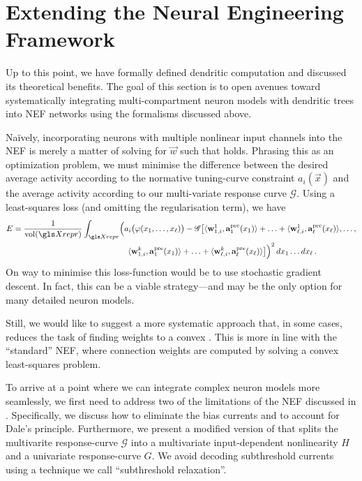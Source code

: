 
\section{Extending the Neural Engineering Framework}
\label{sec:nef_extension}

Up to this point, we have formally defined dendritic computation and discussed its theoretical benefits.
The goal of this section is to open avenues toward systematically integrating multi-compartment neuron models with dendritic trees into NEF networks using the formalisms discussed above.

Na\"ively, incorporating neurons with multiple nonlinear input channels into the NEF is merely a matter of solving for $\vec w$ such that  holds.
Phrasing this as an optimization problem, we must minimise the difference between the desired average activity according to the normative tuning-curve constraint $a_i(\vec x)$ and the average activity according to our multi-variate response curve $\mathscr{G}$.
Using a least-squares loss (and omitting the regularisation term), we have
\begin{align}
	\begin{aligned}
	E &=
	\frac{1}{\vol(\Xrepr)} \int_{\Xrepr} \Bigl( a_i\bigl(\phi(x_1, \ldots, x_\ell)\bigr) -
	\mathscr{G} \bigl[
		\langle \vec w_{1, i}^1, \vec a^\mathrm{pre}_1(x_1) \rangle + \ldots +
		\langle \vec w_{\ell, i}^1, \vec a^\mathrm{pre}_\ell(x_\ell) \rangle, \ldots,\\
	&~\hspace{13.825em}
		\langle \vec w_{1, i}^k, \vec a^\mathrm{pre}_1(x_1) \rangle + \ldots +
		\langle \vec w_{\ell, i}^k, \vec a^\mathrm{pre}_\ell(x_\ell) \rangle
	\bigr] \Bigr)^2 \,dx_1 \ldots dx_\ell \,.
	\end{aligned}
	\label{eqn:dendritic_computation_optimisation}
\end{align}
On way to minimise this loss-function would be to use stochastic gradient descent.
In fact, this can be a viable strategy---and may be the only option for many detailed neuron models.

Still, we would like to suggest a more systematic approach that, in some cases, reduces the task of finding weights to a convex \qprog.
This is more in line with the \enquote{standard} NEF, where connection weights are computed by solving a convex least-squares problem.

To arrive at a point where we can integrate complex neuron models more seamlessly, we first need to address two of the limitations of the NEF discussed in .
Specifically, we discuss how to eliminate the bias currents and to account for Dale's principle.
Furthermore, we present a modified version of  that splits the multivarite response-curve $\mathscr{G}$ into a multivariate input-dependent nonlinearity $H$ and a univariate response-curve $G$.
We avoid decoding subthreshold currents using a technique we call \enquote{subthreshold relaxation}.

